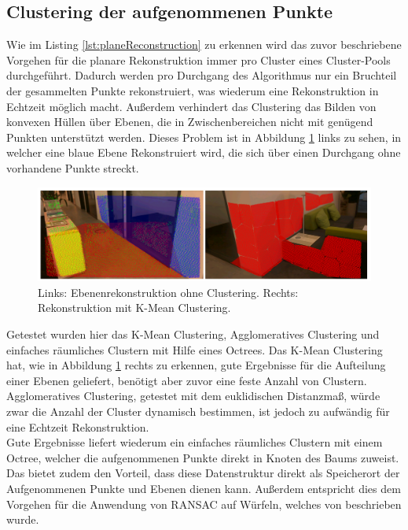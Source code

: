 \subsection{Clustering der aufgenommenen Punkte} \label{sec:cluster}

Wie im Listing \ref{lst:planeReconstruction} zu erkennen wird das zuvor beschriebene Vorgehen für die planare Rekonstruktion immer pro Cluster eines Cluster-Pools durchgeführt. Dadurch werden pro Durchgang des Algorithmus nur ein Bruchteil der gesammelten Punkte rekonstruiert, was wiederum eine Rekonstruktion in Echtzeit möglich macht. Außerdem verhindert das Clustering das Bilden von konvexen Hüllen über Ebenen, die in Zwischenbereichen nicht mit genügend Punkten unterstützt werden. Dieses Problem ist in Abbildung \ref{fig:clustering} links zu sehen, in welcher eine blaue Ebene Rekonstruiert wird, die sich über einen Durchgang ohne vorhandene Punkte streckt.\\

\begin{figure}[h]
  \centering
	\includegraphics[width=1.0\textwidth]{content/images/methods/clustering.png} 
  \caption{Links: Ebenenrekonstruktion ohne Clustering. Rechts: Rekonstruktion mit K-Mean Clustering.}
  \label{fig:clustering}
\end{figure}

Getestet wurden hier das K-Mean Clustering, Agglomeratives Clustering und einfaches räumliches Clustern mit Hilfe eines Octrees. Das K-Mean Clustering hat, wie in Abbildung \ref{fig:clustering} rechts zu erkennen, gute Ergebnisse für die Aufteilung einer Ebenen geliefert, benötigt aber zuvor eine feste Anzahl von Clustern. Agglomeratives Clustering, getestet mit dem euklidischen Distanzmaß, würde zwar die Anzahl der Cluster dynamisch bestimmen, ist jedoch zu aufwändig für eine Echtzeit Rekonstruktion. \\

Gute Ergebnisse liefert wiederum ein einfaches räumliches Clustern mit einem Octree, welcher die aufgenommenen Punkte direkt in Knoten des Baums zuweist. Das bietet zudem den Vorteil, dass diese Datenstruktur direkt als Speicherort der Aufgenommenen Punkte und Ebenen dienen kann. Außerdem entspricht dies dem Vorgehen für die Anwendung von RANSAC auf Würfeln, welches von \citet{yang2010plane} beschrieben wurde. \\
